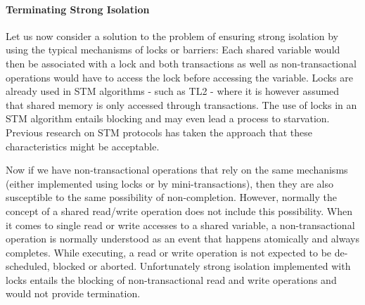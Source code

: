 \documentclass[runningheads,a4paper]{article}
\begin{document}
\paragraph{Terminating Strong  Isolation}


Let us now consider a solution to  the problem of  ensuring strong isolation 
by using the typical mechanisms of locks or barriers: Each shared
variable would then  
be associated with a lock and both transactions as well as non-transactional 
operations would have to access the lock before accessing the variable.
Locks are already used  in STM algorithms - such as TL2 \cite{DSS06} - where it is
however     assumed   that  shared   memory   is   only  accessed   through
transactions. The use  of locks  in an STM algorithm  entails blocking and may
even lead a process to starvation.
Previous research on STM protocols has taken the approach that
these characteristics might be acceptable.

Now if we have non-transactional operations that rely on the same mechanisms
(either implemented using locks or by mini-transactions), then they are also susceptible
to the same possibility of non-completion.
However, normally the concept of a shared read/write operation does not include this possibility.
When it  comes to single read or  write accesses  to  a shared
variable, a  non-transactional operation is normally understood  as an
event  that  happens   atomically  and always  completes.
While executing, a  read  or write  operation   is  not 
expected  to  be de-scheduled, blocked or aborted.  
Unfortunately   strong
isolation  implemented with  locks  entails the blocking  
of non-transactional read and write operations and would not provide termination.
\end{document}
